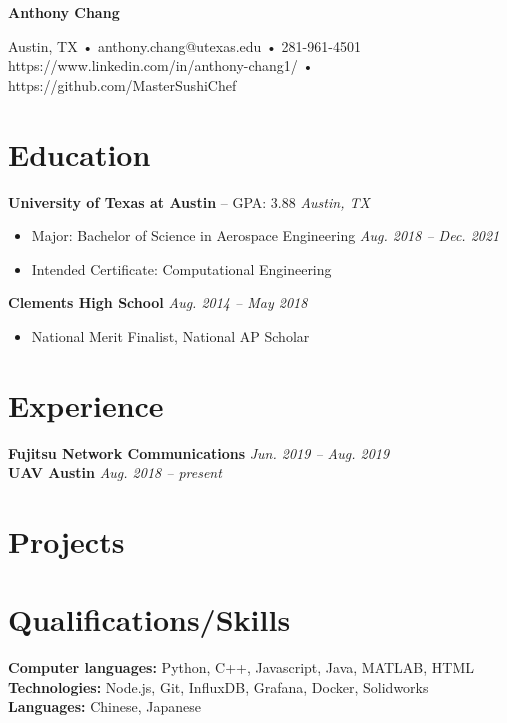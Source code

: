 \documentclass[letterpaper,11pt]{article}
\begin{document}
\begin{center}
\textbf{\LARGE{Anthony Chang}}

Austin, TX • anthony.chang@utexas.edu • 281-961-4501\\
https://www.linkedin.com/in/anthony-chang1/ • https://github.com/MasterSushiChef
\end{center}

\section{Education}
\textbf{University of Texas at Austin} -- GPA: 3.88 \hfill \textit{Austin, TX}\\
\begin{itemize}[noitemsep, topsep=0pt]
\item Major: Bachelor of Science in Aerospace Engineering \hfill \textit{Aug. 2018 -- Dec. 2021}\\
\item\small{Intended Certificate: Computational Engineering}\\
\end{itemize}
\bigskip
\textbf{\small{Clements High School}} \hfill \textit{Aug. 2014 -- May 2018}
\begin{itemize}[noitemsep, topsep=0pt]
  \item \small{National Merit Finalist, National AP Scholar}
\end{itemize}

\section{Experience}
\textbf{Fujitsu Network Communications} \hfill \textit{Jun. 2019 -- Aug. 2019}\\
\textbf{UAV Austin} \hfill \textit{Aug. 2018 -- present}
\section{Projects}
\section{Qualifications/Skills}
\textbf{Computer languages:} Python, C++, Javascript, Java, MATLAB, HTML\\
\textbf{Technologies:} Node.js, Git, InfluxDB, Grafana, Docker, Solidworks\\
\textbf{Languages:} Chinese, Japanese\\
\end{document}
